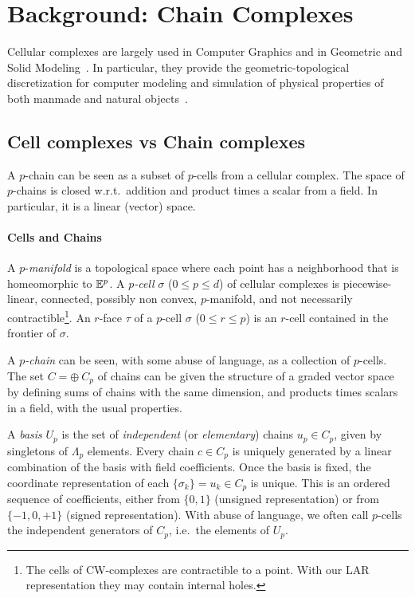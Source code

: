 \section{Background: Chain Complexes}\label{chain-complexes}

Cellular complexes are largely used in Computer Graphics and in Geometric and Solid Modeling~\cite{Elter:10.1007/978-3-642-78114-8_12}. In particular, they provide the geometric-topological discretization for computer modeling and simulation of physical properties of both manmade and natural objects~\cite{DiCarlo:2009:DPU:1629255.1629273,ieee-tase}.

\subsection{Cell complexes vs Chain complexes}
\label{cell-complexes-vs-chain-complexes}


A \(p\)-chain can be seen as a subset of \(p\)-cells from a cellular
complex. The space of \(p\)-chains is closed
w.r.t.~addition and product times a scalar from a field. In particular, it is a linear (vector) space.

\paragraph{Cells and Chains}\label{sec:chain}
A $p$-\emph{manifold} is a topological space where each point has a neighborhood
that is homeomorphic to $\mathbb{E}^p$. A \emph{$p$-cell} $\sigma$ ($0\leq p\leq d$) of cellular complexes is piecewise-linear, connected, possibly non convex, $p$-manifold, and not necessarily contractible\footnote{The cells of CW-complexes are contractible to a point. With our LAR representation they may contain internal holes.}. An
$r$-face $\tau$ of a $p$-cell $\sigma$ ($0\leq r\leq p$) is an $r$-cell contained
in the frontier of $\sigma$.


A \emph{$p$-chain} can be seen, with some abuse of language, as a collection of $p$-cells.
The set $C=\oplus\ C_p$ of chains can be given the structure of a graded vector space  by
defining sums of chains with the same dimension, and products times scalars in a
field, with the usual properties.

A \emph{basis} $U_p$  is the set of \emph{independent} (or \emph{elementary}) chains $u_p \in C_p$, given
by singletons of $\Lambda_p$ elements. Every chain $c\in C_p$ is uniquely generated by
a linear combination of the basis with field coefficients. Once  the  basis is fixed, the coordinate
representation of each $\{\sigma_k\} = u_k \in C_p$ is unique. This is an ordered
sequence of coefficients, either from $\{0,1\}$ (unsigned representation) or from
$\{-1,0,+1\}$ (signed representation). With abuse of language, we
often call $p$-cells the independent generators of $C_p$, {i.e.}~the elements of
$U_p$.


